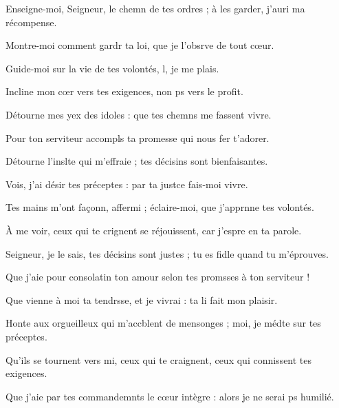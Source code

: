 \item Enseigne-moi, Seigneur, le chemn de tes ordres ;\psstar{} à les garder, j’auri ma récompense.
\item Montre-moi comment gardr ta loi,\psstar{} que je l’obsrve de tout cœur.
\item Guide-moi sur la vie de tes volontés,\psstar{} l, je me plais.
\item Incline mon cœr vers tes exigences,\psstar{} non ps vers le profit.
\item Détourne mes yex des idoles :\psstar{} que tes chemns me fassent vivre.
\item Pour ton serviteur accompls ta promesse\psstar{} qui nous fer t’adorer.
\item Détourne l’inslte qui m’effraie ;\psstar{} tes décisins sont bienfaisantes.
\item Vois, j’ai désir tes préceptes :\psstar{} par ta justce fais-moi vivre.
\item Tes mains m’ont façonn, affermi ;\psstar{} éclaire-moi, que j’apprnne tes volontés.
\item À me voir, ceux qui te crignent se réjouissent,\psstar{} car j’espre en ta parole.
\item Seigneur, je le sais, tes décisins sont justes ;\psstar{} tu es fidle quand tu m’éprouves.
\item Que j’aie pour consolatin ton amour\psstar{} selon tes promsses à ton serviteur !
\item Que vienne à moi ta tendrsse, et je vivrai :\psstar{} ta li fait mon plaisir.
\item Honte aux orgueilleux qui m’accblent de mensonges ;\psstar{} moi, je médte sur tes préceptes.
\item Qu’ils se tournent vers mi, ceux qui te craignent,\psstar{} ceux qui connissent tes exigences.
\item Que j’aie par tes commandemnts le cœur intègre :\psstar{} alors je ne serai ps humilié.